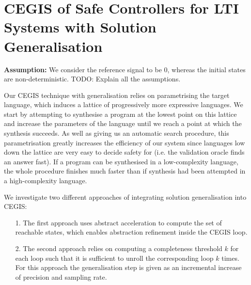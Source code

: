 \documentclass[runningheads,a4paper]{llncs}
\newcommand{\todo}[1]{{\color{red} TODO: #1}}
\begin{document}


\section{CEGIS of Safe Controllers for LTI Systems with Solution Generalisation} 
\label{sec:CEGARIS} 


{\bf Assumption:} We consider the reference signal to be 0, whereas the initial states are non-deterministic.
\todo{Explain all the assumptions.}

Our CEGIS technique with generalisation %
relies on parametrising the target language, which
induces a lattice of progressively more expressive languages.  We
start by attempting to synthesise a program at the lowest point on
this lattice and increase the parameters of the language until we
reach a point at which the synthesis succeeds. As well as giving us an
automatic search procedure, this parametrisation greatly increases the
efficiency of our system since languages low down the lattice are very
easy to decide safety for (i.e. the validation oracle finds an answer
fast). If a program can be synthesised in a low-complexity language,
the whole procedure finishes much faster than if synthesis had been
attempted in a high-complexity language.

We investigate two different approaches of integrating solution generalisation 
into CEGIS:
\begin{itemize}
\item[1.] The first approach uses abstract acceleration to compute the set of reachable states, which 
enables abstraction refinement inside the CEGIS loop. 
\item[2.] The second approach relies on computing a completeness threshold $k$ for each loop such that it is sufficient to 
unroll the corresponding loop $k$ times. For this approach the generalisation step is given as an incremental
increase of precision and sampling rate.
\end{itemize}
\end{document}
